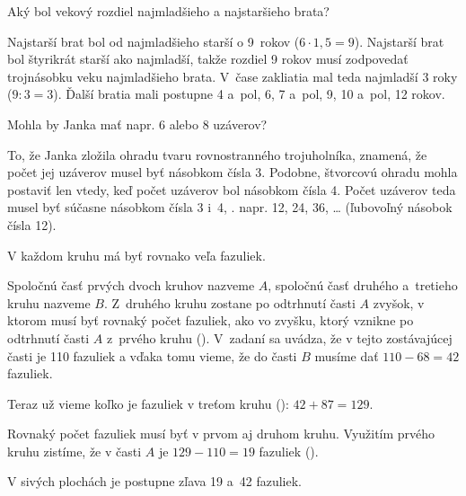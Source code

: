 {%
\napad
Aký bol vekový rozdiel najmladšieho a najstaršieho brata?

\riesenie
Najstarší brat bol od najmladšieho starší o 9~rokov ($6\cdot 1{,}5=9$).
Najstarší brat bol štyrikrát starší ako najmladší, takže
rozdiel 9 rokov musí zodpovedať trojnásobku veku najmladšieho brata.
V~čase zakliatia mal teda najmladší 3 roky ($9:3=3$).
Ďalší bratia mali postupne 4 a~pol, 6, 7 a~pol, 9, 10 a~pol, 12 rokov.
}

{%
\napad
Mohla by Janka mať napr. 6 alebo 8 uzáverov?

\riesenie
To, že  Janka zložila ohradu tvaru rovnostranného trojuholníka, znamená, že
počet jej uzáverov musel byť násobkom čísla 3.
Podobne, štvorcovú ohradu mohla postaviť len vtedy, keď počet uzáverov bol
násobkom čísla 4.
Počet uzáverov teda musel byť súčasne násobkom čísla 3 i~4, \tj. napr. 12,
24, 36, \dots{} (ľubovoľný násobok čísla 12).
}

{%
\napad
V každom kruhu má byť rovnako veľa fazuliek.

\riesenie
Spoločnú časť prvých dvoch kruhov nazveme $A$, spoločnú časť druhého a~tretieho kruhu nazveme $B$.
Z~druhého kruhu zostane po odtrhnutí časti $A$ zvyšok, v ktorom musí byť rovnaký počet fazuliek, ako vo zvyšku, ktorý vznikne po odtrhnutí časti $A$ z~prvého kruhu (\obr).
V~zadaní sa uvádza, že v tejto zostávajúcej časti je 110 fazuliek a vďaka tomu
vieme, že do časti $B$ musíme dať
$110 - 68 = 42$
fazuliek.
%

Teraz už vieme koľko je fazuliek v treťom kruhu (\obr):
$42 + 87 = 129$.
%

Rovnaký počet fazuliek musí byť v prvom aj druhom kruhu. Využitím prvého kruhu zistíme, že v časti $A$ je
$129 - 110 = 19$ fazuliek (\obr).

V sivých plochách je postupne zľava 19 a~42 fazuliek.
}

